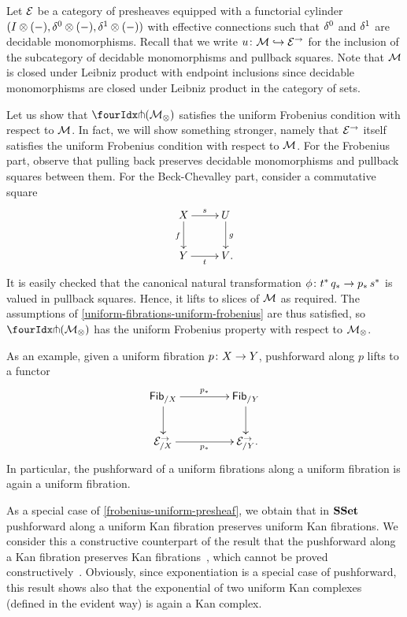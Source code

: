 \documentclass[reqno,10pt,a4paper,oneside,draft]{amsart}
\begin{document}
\begin{example} \label{frobenius-uniform-presheaf}
Let $\catE$ be a category of presheaves equipped with a functorial cylinder $(\interval \otimes (-), \lcyl \otimes (-), \rcyl \otimes (-))$ with effective connections such that $\lcyl$ and $\rcyl$ are decidable monomorphisms.
Recall that we write $u \co \cal{M} \hookrightarrow \catE^\to$ for the inclusion of the subcategory of decidable monomorphisms and pullback squares.
Note that $\cal{M}$ is closed under Leibniz product with endpoint inclusions since decidable monomorphisms are closed under Leibniz product in the category of sets.

Let us show that $\liftr{(\cal{M}_\otimes)}$ satisfies the uniform Frobenius condition with respect to $\cal{M}$.
In fact, we will show something stronger, namely that $\catE^\to$ itself satisfies the uniform Frobenius condition with respect to $\cal{M}$.
For the Frobenius part, observe that pulling back preserves decidable monomorphisms and pullback squares between them.
For the Beck-Chevalley part, consider a commutative square
\[
\xymatrix{
  X
  \ar[d]_{f}
  \ar[r]^{s}
&
  U
  \ar[d]^{g}
\\
  Y
  \ar[r]_{t}
&
  V
\rlap{.}}
\]
It is easily checked that the canonical natural transformation $\phi \co t^* \, q_* \to p_* \, s^*$ is valued in pullback squares.
Hence, it lifts to slices of $\cal{M}$ as required.
The assumptions of \cref{uniform-fibrations-uniform-frobenius} are thus satisfied, so $\liftr{(\cal{M}_\otimes)}$ has the uniform Frobenius property with respect to $\cal{M}_\otimes$.

As an example, given a uniform fibration $p \co X \to Y$, pushforward along $p$ lifts to a functor
\[
\xymatrix@C+2em{
  \Fib_{/X}
  \ar[r]^{p_*}
  \ar[d]
& \Fib_{/Y}
  \ar[d]
\\
  \catE_{/X}^\to
  \ar[r]_{p_*}
&
  \catE_{/Y}^\to
\rlap{.}}
\]
In particular, the pushforward of a uniform fibrations along a uniform fibration is again a uniform fibration.
\end{example}

\begin{example}
As a special case of \cref{frobenius-uniform-presheaf}, we obtain that in $\SSet$ pushforward along a uniform Kan fibration preserves uniform Kan fibrations.
We consider this a constructive counterpart of the result that the pushforward along a Kan fibration preserves Kan fibrations~\cite{voevodsky-simplicial-model}, which cannot be proved constructively~\cite{coquand-non-constructivity-kan}.
Obviously, since exponentiation is a special case of pushforward, this result shows also that the exponential of two uniform Kan complexes (defined in the evident way) is again a Kan complex.
\end{example}
\end{document}
